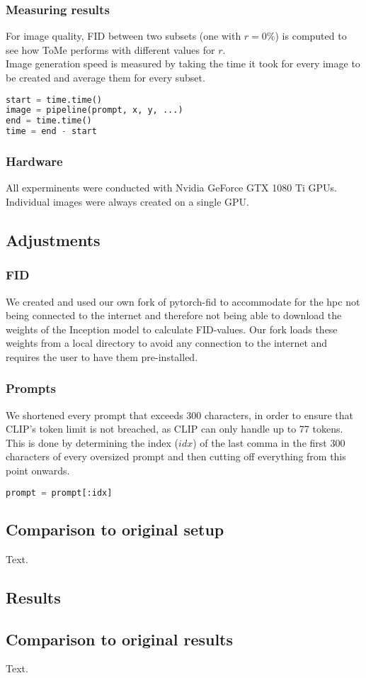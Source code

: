 \subsubsection*{Measuring results}
For image quality, FID between two subsets (one with \(r=0\%\)) is computed to see how ToMe performs with different values for \(r\).\\
Image generation speed is measured by taking the time it took for every image to be created and average them for every subset.
\begin{lstlisting}[language=Python]
start = time.time()
image = pipeline(prompt, x, y, ...)
end = time.time()
time = end - start
\end{lstlisting}



\subsubsection*{Hardware}
All experminents were conducted with Nvidia GeForce GTX 1080 Ti GPUs. Individual images were always created on a single GPU.



\subsection{Adjustments}
\subsubsection*{FID}
We created and used our own fork of pytorch-fid \cite{Seitzer2020FID} to accommodate for the hpc not being connected to the internet and therefore not being able to download the weights of the Inception model to calculate FID-values. Our fork loads these weights from a local directory to avoid any connection to the internet and requires the user to have them pre-installed.



\subsubsection*{Prompts}
We shortened every prompt that exceeds 300 characters, in order to ensure that CLIP's token limit is not breached, as CLIP can only handle up to 77 tokens.
This is done by determining the index (\(idx\)) of the last comma in the first 300 characters of every oversized prompt and then cutting off everything from this point onwards.
\begin{lstlisting}[language=Python]
prompt = prompt[:idx]
\end{lstlisting}



\subsection{Comparison to original setup}
Text.



\newpage
\subsection{Results}




\newpage
\subsection{Comparison to original results}
Text.